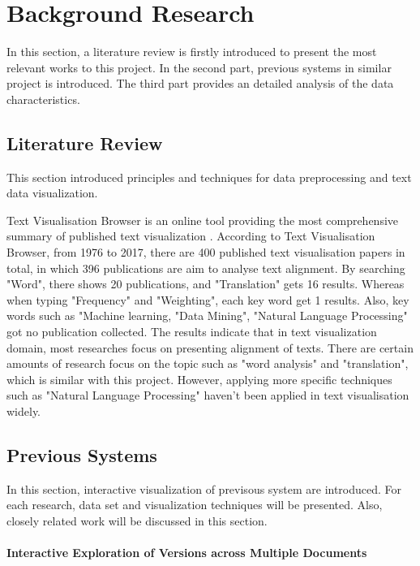 \clearpage
\section{Background Research}

In this section, a literature review is firstly introduced to present the most relevant works to this project. In the second part, previous systems in similar project is introduced. The third part provides an detailed analysis of the data characteristics.

\subsection{Literature Review}
This section introduced principles and techniques for data preprocessing and text data visualization.

Text Visualisation Browser \cite{Kucher2014} is an online tool providing the most comprehensive summary of published text visualization \cite{Cao2016a}. According to Text Visualisation Browser, from 1976 to 2017, there are 400 published text visualisation papers in total, in which 396 publications are aim to analyse text alignment. By searching "Word", there shows 20 publications, and "Translation" gets 16 results. Whereas when typing "Frequency" and "Weighting", each key word get 1 results. Also, key words such as "Machine learning, "Data Mining", "Natural Language Processing" got no publication collected. The results indicate that in text visualization domain, most researches focus on presenting alignment of texts. There are certain amounts of research focus on the topic such as "word analysis" and "translation", which is similar with this project. However, applying more specific techniques such as "Natural Language Processing" haven't been applied in text visualisation widely.


\subsection{Previous Systems}

In this section, interactive visualization of previsous system are introduced. For each research, data set and visualization techniques will be presented. Also, closely related work will be discussed in this section. 

\paragraph{Interactive Exploration of Versions across Multiple Documents}

